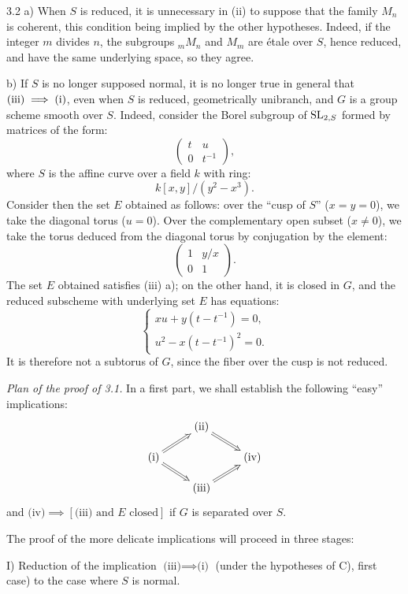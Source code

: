 \begin{remarks}{3.2}\label{XV.3.2}
a) When $S$ is reduced, it is unnecessary in (ii) to suppose that the family $M_n$ is coherent, this condition being implied by the other hypotheses. Indeed, if the integer $m$ divides $n$, the subgroups ${}_mM_n$ and $M_m$ are \'etale over $S$, hence reduced, and have the same underlying space, so they agree.

b) If $S$ is no longer supposed normal, it is no longer true in general that $\textup{(iii)}\implies\textup{(i)}$, even when $S$ is reduced, geometrically unibranch, and $G$ is a group scheme smooth over $S$. Indeed, consider the Borel subgroup of $\operatorname{SL}_{2,S}$ formed by matrices of the form:
\[
\begin{pmatrix}t&u\\0&t^{-1}\end{pmatrix},
\]
where $S$ is the affine curve over a field $k$ with ring:
\[
k[x,y]/(y^2-x^3).
\]
Consider then the set $E$ obtained as follows: over the ``cusp of $S$'' ($x=y=0$), we take the diagonal torus ($u=0$). Over the complementary open subset ($x\ne0$), we take the torus deduced from the diagonal torus by conjugation by the element:
\[
\begin{pmatrix}1&y/x\\0&1\end{pmatrix}.
\]
The set $E$ obtained satisfies (iii) a); on the other hand, it is closed in $G$, and the reduced subscheme with underlying set $E$ has equations:
\[
\begin{cases}xu+y(t-t^{-1})=0,\\u^2-x(t-t^{-1})^2=0.\end{cases}
\]
It is therefore not a subtorus of $G$, since the fiber over the cusp is not reduced.
\end{remarks}

\par\noindent\emph{Plan of the proof of 3.1.}
In a first part, we shall establish the following ``easy'' implications:
\[
\xymatrix@R=12pt{&\text{(ii)}\ar@{=>}[dr]&\\\text{(i)}\ar@{=>}[ur]\ar@{=>}[dr]&&\text{(iv)}\\&\text{(iii)}\ar@{=>}[ur]&}
\]
and $\text{(iv)}\implies[\text{(iii) and }E\text{ closed}]$ if $G$ is separated over $S$.

The proof of the more delicate implications will proceed in three stages:

\noindent I) Reduction of the implication $\text{(iii)}\implies\text{(i)}$ (under the hypotheses of C), first case) to the case where $S$ is normal.

